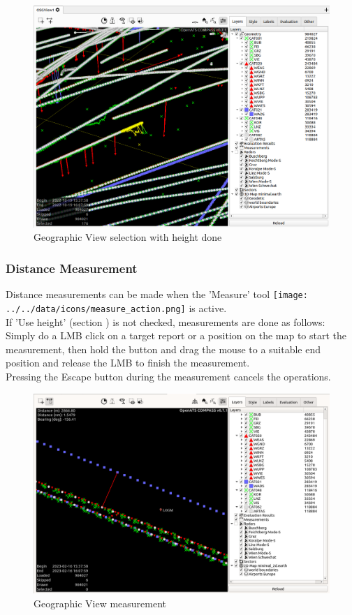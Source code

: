 \begin{figure}[H]
    \hspace*{-2.5cm}
    \includegraphics[width=19cm,frame]{figures/geoview_select3d_2.png}
  \caption{Geographic View selection with height done}
\end{figure}


\subsubsection{Distance Measurement}

Distance measurements can be made when the 'Measure' tool \texttt{[image: ../../data/icons/measure\_action.png]} is active. \\

If 'Use height' (section ) is not checked, measurements are done as follows: Simply do a LMB click on a target report or a position on the map to start the measurement, then hold the button and drag the mouse to a suitable end position and release the LMB to finish the measurement. \\

Pressing the Escape button during the measurement cancels the operations.

\begin{figure}[H]
    \hspace*{-2.5cm}
    \includegraphics[width=19cm,frame]{figures/geoview_measure1.png}
  \caption{Geographic View measurement}
\end{figure}

